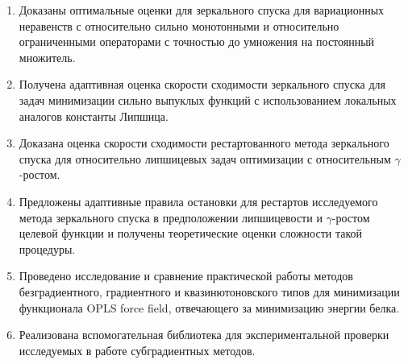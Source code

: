 \begin{enumerate}
  \item Доказаны оптимальные оценки для зеркального спуска для вариационных неравенств с относительно сильно монотонными и относительно ограниченными операторами с точностью до умножения на постоянный множитель.
  \item Получена адаптивная оценка скорости сходимости зеркального спуска для задач минимизации сильно выпуклых функций с использованием локальных аналогов константы Липшица.  
  \item Доказана оценка скорости сходимости рестартованного метода зеркального спуска для относительно липшицевых задач оптимизации с относительным  $\gamma$-ростом.
  \item Предложены адаптивные правила остановки для рестартов исследуемого метода зеркального спуска в предположении липшицевости и 
  $\gamma$-ростом целевой функции и получены теоретические оценки сложности такой  процедуры. 
  \item Проведено исследование и сравнение практической работы методов безградиентного, градиентного и квазинютоновского типов для минимизации функционала OPLS force field, отвечающего за минимизацию энергии белка.
  \item Реализована вспомогательная библиотека для экспериментальной проверки исследуемых в работе субградиентных методов. 
\end{enumerate}
